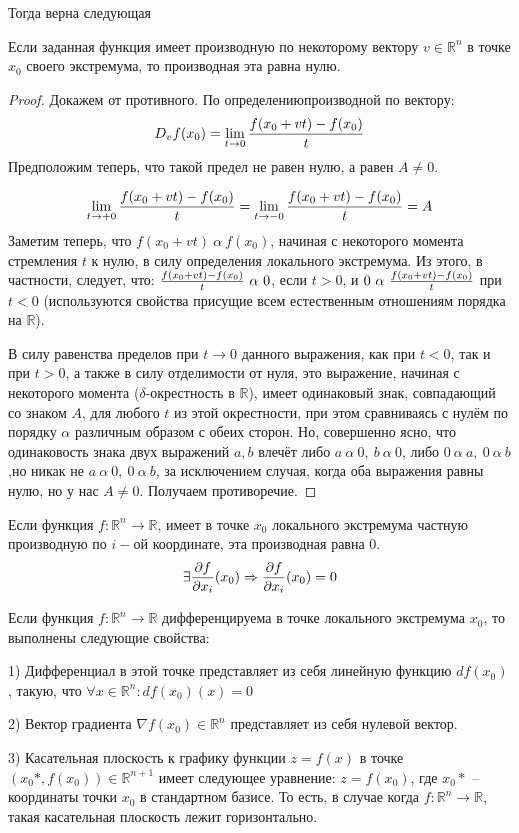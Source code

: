Тогда верна следующая
\begin{theorem}
Если заданная функция имеет производную по некоторому вектору $v \in \mathbb{R}^n$ в точке $x_0$ своего экстремума, то производная эта равна нулю.
\end{theorem}
\begin{proof}


Докажем от противного. 
По определению\linebreak производной по вектору:
$$D_{v}f(x_0) = \lim_{t \to 0}{f(x_0 + vt)-f(x_0) \over t}$$
Предположим теперь, что такой предел не равен нулю, а равен $A \not = 0$.

$$ \lim_{t \to +0}{f(x_0 + vt)-f(x_0) \over t} = \lim_{t \to -0}{f(x_0 + vt)-f(x_0) \over t}=A$$
Заметим теперь, что $f(x_0 +vt)\ \alpha\  f(x_0)$, начиная с некоторого момента стремления $t$ к нулю, в силу определения локального экстремума.
Из этого, в частности, следует, что: ${f(x_0 + vt)-f(x_0) \over t}\ \alpha\ 0$, если $t>0$, и  $0\ \alpha\ {f(x_0 + vt)-f(x_0) \over t}$ при $t<0$ (используются свойства присущие всем естественным отношениям порядка на $\mathbb{R}$).

В силу равенства пределов при $t\to 0$ данного выражения, как при $t<0$, так и при $t>0$, а также в силу отделимости от нуля, это выражение, начиная с некоторого момента ($\delta$-окрестность в $\mathbb{R}$), имеет одинаковый знак, совпадающий со знаком $A$, для любого $t$ из этой окрестности, при этом сравниваясь с нулём по порядку $\alpha$ различным образом с обеих сторон. Но, совершенно ясно, что одинаковость знака двух выражений $a,b$ влечёт либо $a\ \alpha\ 0,\ b\ \alpha\ 0$, либо $0\ \alpha\ a,\ 0\ \alpha\ b$,но никак не $a\ \alpha\ 0,\ 0\ \alpha\ b$, за исключением случая, когда оба выражения равны нулю, но у нас $A \not =0$. Получаем противоречие.
\end{proof}
\begin{consequence}
Если функция $f: \mathbb{R}^n \to \mathbb{R}$, имеет в точке $x_0$ локального экстремума частную производную по $i-ой$ координате, эта производная равна 0.$$\exists {\partial f \over \partial x_i}(x_0) \Rightarrow {\partial f \over \partial x_i}(x_0) = 0$$
\end{consequence}
\begin{consequence}
Если функция $f: \mathbb{R}^n \to \mathbb{R}$ дифференцируема в точке  локального экстремума $x_0$, то выполнены следующие свойства: 

1) Дифференциал в этой точке представляет из себя линейную функцию $df(x_0)$, такую, что $\forall x \in \mathbb{R}^n: df(x_0)(x) = 0$ 

2) Вектор градиента $\nabla f(x_0) \in \mathbb{R}^n$ представляет из себя нулевой вектор. 

3) Касательная плоскость к графику функции $z = f(x)$ в точке $(x_0*,f(x_0)) \in \mathbb{R}^{n+1}$ имеет следующее уравнение: $z = f(x_0)$, где $x_0*$ -- координаты точки $x_0$ в стандартном базисе. То есть, в случае когда $f: \mathbb{R}^n \to \mathbb{R}$, такая касательная плоскость лежит горизонтально.
\end{consequence}

